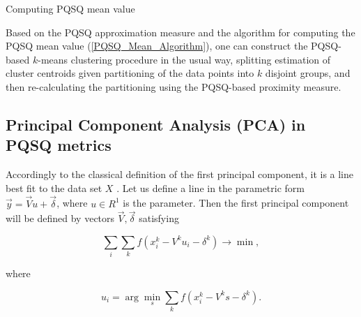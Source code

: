 \documentclass[preprint,12pt]{elsarticle}
\makeatletter
\def\BState{\State\hskip-\ALG@thistlm}
\makeatother
\begin{document}
\begin{algorithm}
\caption{Computing PQSQ mean value}\label{PQSQ_Mean_Algorithm}
\end{algorithm}

Based on the PQSQ approximation measure and the algorithm for computing the PQSQ mean value (\ref{PQSQ_Mean_Algorithm}), one can construct the PQSQ-based $k$-means clustering procedure in the usual way, splitting estimation of cluster centroids given partitioning of the data points into $k$ disjoint groups, and then re-calculating the partitioning using the PQSQ-based proximity measure.

\subsection{Principal Component Analysis (PCA) in PQSQ metrics}

Accordingly to the classical definition of the first principal component, it is a line best fit to the data set $X$ \cite{Pearson1901On}. Let us define a line in the parametric form $\vec{y}=\vec{V}u+\vec{\delta}$, where $u \in R^1$ is the parameter. Then the first principal component will be defined by vectors $\vec{V}, \vec{\delta}$ satisfying

\begin{equation}
\sum_i\sum_k f(x_i^k-V^ku_i-\delta^k) \rightarrow \min,
\end{equation}

\noindent where

\begin{equation}
u_i = \arg \min_s \sum_k f(x_i^k-V^ks-\delta^k).
\end{equation}
\end{document}
